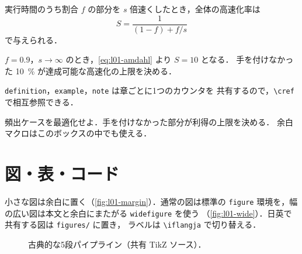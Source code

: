 \documentclass[../main.tex]{subfiles}
\begin{document}
\begin{definition}[高速化率]
  実行時間のうち割合 $f$ の部分を $s$ 倍速くしたとき，全体の高速化率は
  \begin{equation}
    S = \frac{1}{(1-f) + f/s}
    \label{eq:l01-amdahl}
  \end{equation}
  で与えられる．
\end{definition}

\begin{example}
  $f = 0.9$，$s \to \infty$ のとき，\cref{eq:l01-amdahl} より $S = 10$ となる．
  手を付けなかった \SI{10}{\percent} が達成可能な高速化の上限を決める．
\end{example}

\begin{note}
  \verb|definition|，\verb|example|，\verb|note| は章ごとに1つのカウンタを
  共有するので，\verb|\cref| で相互参照できる．
\end{note}

\begin{keypoint}
  頻出ケースを最適化せよ．手を付けなかった部分が利得の上限を決める．
  余白マクロはこのボックスの中でも使える．
\end{keypoint}

\section{図・表・コード}

\begin{marginfigure}
  \caption{余白に置いた図（\texttt{marginfigure}）．}
  \label{fig:l01-margin}
\end{marginfigure}

小さな図は余白に置く（\cref{fig:l01-margin}）．通常の図は標準の \verb|figure|
環境を，幅の広い図は本文と余白にまたがる \verb|widefigure| を使う
（\cref{fig:l01-wide}）．日英で共有する図は \texttt{figures/} に置き，
ラベルは \verb|\iflangja| で切り替える．

\begin{figure}[htbp]
  \centering
  
  \caption{古典的な5段パイプライン（共有 TikZ ソース）．}
  \label{fig:l01-pipeline}
\end{figure}
\end{document}

